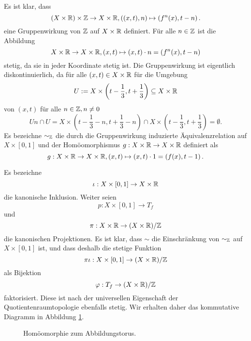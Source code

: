 \documentclass[a4paper,10pt]{article}
\begin{document}
\section{}
Es ist klar, dass
\[
 (X \times \mathbb{R}) \times \mathbb{Z} \to X \times \mathbb{R}, ((x,t),n) \mapsto \left( f^{n}(x), t-n \right).
\]
eine Gruppenwirkung von $\mathbb{Z}$ auf $X \times \mathbb{R}$ definiert. Für alle $n \in \mathbb{Z}$ ist die Abbildung
\[
 X \times \mathbb{R} \to X \times \mathbb{R}, (x,t) \mapsto (x,t) \cdot n =  \left( f^{n}(x), t-n \right)
\]
stetig, da sie in jeder Koordinate stetig ist. Die Gruppenwirkung ist eigentlich diskontinuierlich, da für alle $(x,t) \in X \times \mathbb{R}$ für die Umgebung
\[
 U := X \times \left( t-\frac{1}{3} , t + \frac{1}{3} \right) \subseteq X \times \mathbb{R}
\]
von $(x,t)$ für alle $n \in \mathbb{Z}, n \neq 0$
\[
 Un \cap U
 = X \times \left( t-\frac{1}{3}-n, t+\frac{1}{3}-n \right) \cap X \times \left( t-\frac{1}{3}, t+\frac{1}{3} \right)
 = \emptyset.
\]
Es bezeichne $\sim_{\mathbb{Z}}$ die durch die Gruppenwirkung induzierte Äquivalenzrelation auf $X \times [0,1]$ und der Homöomorphismus $g : X \times \mathbb{R} \to X \times \mathbb{R}$ definiert als
\[
 g : X \times \mathbb{R} \to X \times \mathbb{R}, (x,t) \mapsto (x,t) \cdot 1 = \left( f(x), t-1 \right).
\]

Es bezeichne
\[
 \iota : X \times [0,1] \to X \times \mathbb{R}
\]
die kanonische Inklusion. Weiter seien
\[
 p : X \times [0,1] \to T_f
\]
und
\[
 \pi : X \times \mathbb{R} \to (X \times \mathbb{R})/\mathbb{Z}
\]
die kanonischen Projektionen. Es ist klar, dass $\sim$ die Einschränkung von $\sim_{\mathbb{Z}}$ auf $X \times [0,1]$ ist, und dass deshalb die stetige Funktion
\[
 \pi \iota : X \times [0,1] \to (X \times \mathbb{R})/\mathbb{Z}
\]
als Bijektion
\[
 \varphi : T_f \to (X \times \mathbb{R})/\mathbb{Z}
\]
faktorisiert. Diese ist nach der universellen Eigenschaft der Quotientenraumtopologie ebenfalls stetig. Wir erhalten daher das kommutative Diagramm in Abbildung \ref{fig: Abbildungstorus}.
\begin{figure}[ht]\centering
 \caption{Homöomorphie zum Abbildungstorus.}
 \label{fig: Abbildungstorus}
\end{figure}
\end{document}
